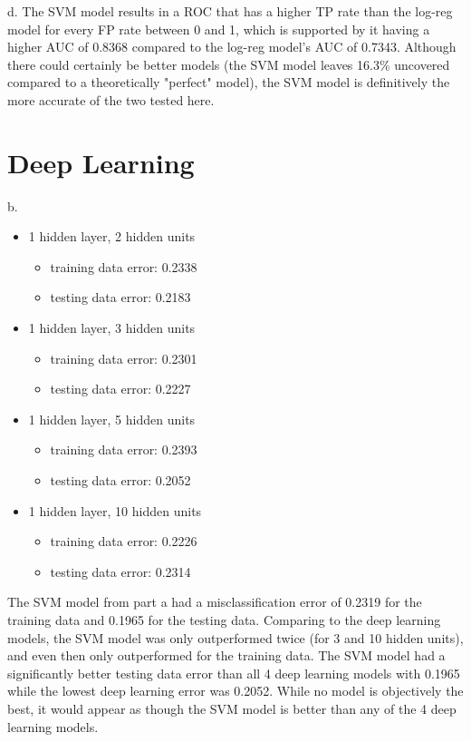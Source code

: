 \documentclass[a4paper]{article}
\begin{document}
\medskip\noindent
d. The SVM model results in a ROC that has a higher TP rate than the log-reg model for every FP rate between 0 and 1, which is supported by it having a higher AUC of 0.8368 compared to the log-reg model's AUC of 0.7343. Although there could certainly be better models (the SVM model leaves 16.3\% uncovered compared to a theoretically "perfect" model), the SVM model is definitively the more accurate of the two tested here.

\section{Deep Learning}

b.
\newline\noindent 


\begin{itemize}
    \item 1 hidden layer, 2 hidden units
    \begin{itemize}
        \item training data error:  0.2338
        \item testing data error: 0.2183
    \end{itemize}
    \item 1 hidden layer, 3 hidden units
    \begin{itemize}
        \item training data error: 0.2301
        \item testing data error: 0.2227
    \end{itemize}
    \item 1 hidden layer, 5 hidden units
    \begin{itemize}
        \item training data error:  0.2393
        \item testing data error: 0.2052
    \end{itemize}
    \item 1 hidden layer, 10 hidden units
    \begin{itemize}
        \item training data error:  0.2226
        \item testing data error: 0.2314
    \end{itemize}
\end{itemize}

\medskip\noindent
The SVM model from part a had a misclassification error of 0.2319 for the training data and 0.1965 for the testing data. Comparing to the deep learning models, the SVM model was only outperformed twice (for 3 and 10 hidden units), and even then only outperformed for the training data. The SVM model had a significantly better testing data error than all 4 deep learning models with 0.1965 while the lowest deep learning error was 0.2052. While no model is objectively the best, it would appear as though the SVM model is better than any of the 4 deep learning models.
\end{document}
